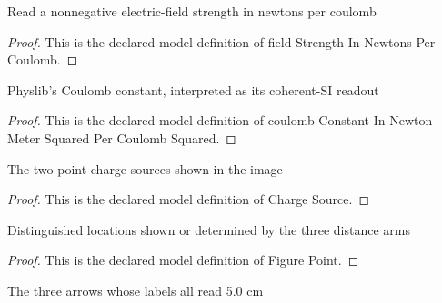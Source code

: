 \begin{definition}
  \label{def:physics:phyx-mini-0831:phyxminiproblems-problemphyxmini0831-fieldstrengthinnewtonspercoulomb}
  Read a nonnegative electric-field strength in newtons per coulomb
\end{definition}
\begin{proof}
  This is the declared model definition of field Strength In Newtons Per Coulomb.
\end{proof}
\begin{definition}
  \label{def:physics:phyx-mini-0831:phyxminiproblems-problemphyxmini0831-coulombconstantinnewtonmetersquaredpercoulombsquared}
  Physlib's Coulomb constant, interpreted as its coherent-SI readout
\end{definition}
\begin{proof}
  This is the declared model definition of coulomb Constant In Newton Meter Squared Per Coulomb Squared.
\end{proof}
\begin{definition}
  \label{def:physics:phyx-mini-0831:phyxminiproblems-problemphyxmini0831-chargesource}
  The two point-charge sources shown in the image
\end{definition}
\begin{proof}
  This is the declared model definition of Charge Source.
\end{proof}
\begin{definition}
  \label{def:physics:phyx-mini-0831:phyxminiproblems-problemphyxmini0831-figurepoint}
  Distinguished locations shown or determined by the three distance arms
\end{definition}
\begin{proof}
  This is the declared model definition of Figure Point.
\end{proof}
\begin{definition}
  \label{def:physics:phyx-mini-0831:phyxminiproblems-problemphyxmini0831-figurearm}
  The three arrows whose labels all read 5.0 cm
\end{definition}
